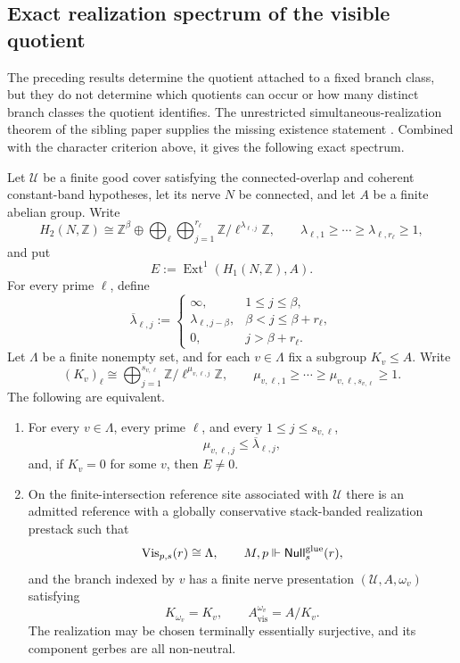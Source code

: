 \subsection{Exact realization spectrum of the visible quotient}

The preceding results determine the quotient attached to a fixed branch
class, but they do not determine which quotients can occur or how many
distinct branch classes the quotient identifies. The unrestricted
simultaneous-realization theorem of the sibling paper supplies the missing
existence statement \cite[Theorem~6.1]{HomologicalVisibilityGluingObstructions2026}.
Combined with the character criterion above, it gives the following exact
spectrum.

\begin{theorem}\label{thm:exact-visible-quotient-spectrum}
Let $\mathcal U$ be a finite good cover satisfying the connected-overlap and
coherent constant-band hypotheses, let its nerve $N$ be connected, and let
$A$ be a finite abelian group. Write
\[
H_2(N,\mathbb Z)
\cong
\mathbb Z^{\beta}\oplus
\bigoplus_\ell\bigoplus_{j=1}^{r_\ell}\mathbb Z/\ell^{\lambda_{\ell,j}}\mathbb Z,
\qquad
\lambda_{\ell,1}\ge\cdots\ge\lambda_{\ell,r_\ell}\ge1,
\]
and put
\[
E:=\operatorname{Ext}^1(H_1(N,\mathbb Z),A).
\]
For every prime $\ell$, define
\[
\overline\lambda_{\ell,j}:=
\begin{cases}
\infty,&1\le j\le\beta,\\
\lambda_{\ell,j-\beta},&\beta<j\le\beta+r_\ell,\\
0,&j>\beta+r_\ell.
\end{cases}
\]
Let $\Lambda$ be a finite nonempty set, and for each $v\in\Lambda$ fix a
subgroup $K_v\le A$. Write
\[
(K_v)_\ell\cong
\bigoplus_{j=1}^{s_{v,\ell}}\mathbb Z/\ell^{\mu_{v,\ell,j}}\mathbb Z,
\qquad
\mu_{v,\ell,1}\ge\cdots\ge\mu_{v,\ell,s_{v,\ell}}\ge1.
\]
The following are equivalent.
\begin{enumerate}[label=(\roman*),nosep]
\item For every $v\in\Lambda$, every prime $\ell$, and every
$1\le j\le s_{v,\ell}$,
\[
\mu_{v,\ell,j}\le\overline\lambda_{\ell,j},
\]
and, if $K_v=0$ for some $v$, then $E\ne0$.
\item On the finite-intersection reference site associated with $\mathcal U$
there is an admitted reference with a globally conservative stack-banded
realization prestack such that
\[
\mathrm{Vis}_{p,s}(r)\cong\Lambda,
\qquad
M,p\Vdash\mathsf{Null}_s^{\mathrm{glue}}(r),
\]
and the branch indexed by $v$ has a finite nerve presentation
$(\mathcal U,A,\omega_v)$ satisfying
\[
K_{\omega_v}=K_v,
\qquad
A_{\mathrm{vis}}^{\omega_v}=A/K_v.
\]
The realization may be chosen terminally essentially surjective, and its
component gerbes are all non-neutral.
\end{enumerate}


\end{theorem}
